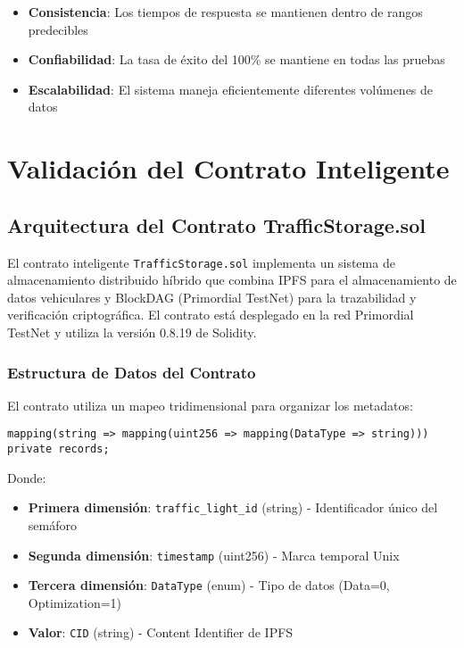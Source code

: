 \documentclass[onecolumn]{article}
\begin{document}
\begin{itemize}
    \item \textbf{Consistencia}: Los tiempos de respuesta se mantienen dentro de rangos predecibles
    \item \textbf{Confiabilidad}: La tasa de éxito del 100\% se mantiene en todas las pruebas
    \item \textbf{Escalabilidad}: El sistema maneja eficientemente diferentes volúmenes de datos
\end{itemize}

\section{Validación del Contrato Inteligente}

\subsection{Arquitectura del Contrato TrafficStorage.sol}

El contrato inteligente \texttt{TrafficStorage.sol} implementa un sistema de almacenamiento distribuido híbrido que combina IPFS para el almacenamiento de datos vehiculares y BlockDAG (Primordial TestNet) para la trazabilidad y verificación criptográfica. El contrato está desplegado en la red Primordial TestNet y utiliza la versión 0.8.19 de Solidity.

\subsubsection{Estructura de Datos del Contrato}

El contrato utiliza un mapeo tridimensional para organizar los metadatos:

\begin{verbatim}
mapping(string => mapping(uint256 => mapping(DataType => string))) private records;
\end{verbatim}

Donde:
\begin{itemize}
    \item \textbf{Primera dimensión}: \texttt{traffic\_light\_id} (string) - Identificador único del semáforo
    \item \textbf{Segunda dimensión}: \texttt{timestamp} (uint256) - Marca temporal Unix
    \item \textbf{Tercera dimensión}: \texttt{DataType} (enum) - Tipo de datos (Data=0, Optimization=1)
    \item \textbf{Valor}: \texttt{CID} (string) - Content Identifier de IPFS
\end{itemize}
\end{document}
